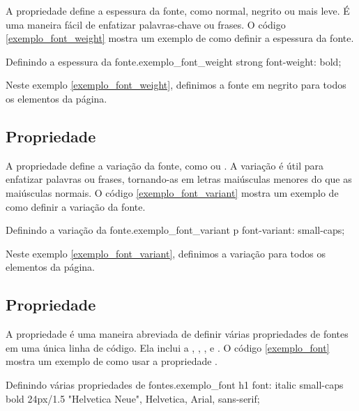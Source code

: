 A propriedade  define a espessura da fonte, como normal, negrito ou mais leve. É uma maneira fácil de enfatizar palavras-chave ou frases. O código \ref{exemplo_font_weight} mostra um exemplo de como definir a espessura da fonte.

\begin{csscode}{Definindo a espessura da fonte.}{exemplo_font_weight}
strong {
    font-weight: bold;
}
\end{csscode}

Neste exemplo \ref{exemplo_font_weight}, definimos a fonte em negrito para todos os elementos  da página.

\subsection{Propriedade }

A propriedade  define a variação da fonte, como  ou . A variação  é útil para enfatizar palavras ou frases, tornando-as em letras maiúsculas menores do que as maiúsculas normais. O código \ref{exemplo_font_variant} mostra um exemplo de como definir a variação da fonte.

\begin{csscode}{Definindo a variação da fonte.}{exemplo_font_variant}
p {
    font-variant: small-caps;
}
\end{csscode}

Neste exemplo \ref{exemplo_font_variant}, definimos a variação  para todos os elementos  da página.

\subsection{Propriedade }

A propriedade  é uma maneira abreviada de definir várias propriedades de fontes em uma única linha de código. Ela inclui a , , ,  e . O código \ref{exemplo_font} mostra um exemplo de como usar a propriedade .

\begin{csscode}{Definindo várias propriedades de fontes.}{exemplo_font}
h1 {
    font: italic small-caps bold 24px/1.5 "Helvetica Neue", Helvetica, Arial, sans-serif;
}
\end{csscode}

